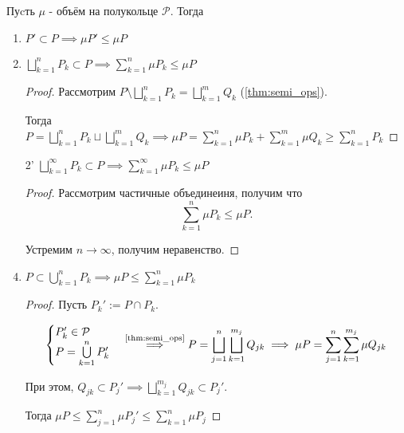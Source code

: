 \begin{properties} \thmslashn

    Пуcть $\mu$ - объём на полукольце $\mathcal{P}$. Тогда

    \begin{enumerate}
        \item $P' \subset P \implies \mu P' \le \mu P$
        \item $\bigsqcup\limits_{k=1}^{n} P_{k} \subset P \implies \sum\limits_{k=1}^{n} \mu P_{k} \le \mu P$
            \begin{proof} \thmslashn
            
                Рассмотрим $P \setminus \bigsqcup\limits_{k=1}^{n} P_{k}= \bigsqcup\limits_{k=1}^{m} Q_{k} $ (\autoref{thm:semi_ops}).

                Тогда $P = \bigsqcup\limits_{k=1}^{n} P_{k}\sqcup \bigsqcup\limits_{k=1}^{m} Q_{k} \implies \mu P = \sum\limits_{k=1}^{n} \mu P_{k} + \sum\limits_{k=1}^{m} \mu Q_{k} \ge \sum\limits_{k=1}^{n} P_{k}  $
            \end{proof}
        \item[2'] $\bigsqcup\limits_{k=1}^{\infty} P_{k} \subset P \implies \sum\limits_{k=1}^{\infty} \mu P_{k} \le \mu P$
            \begin{proof} \thmslashn
            
                Рассмотрим частичные объединеиня, получим что 
                \[ \sum\limits_{k=1}^{n} \mu P_{k} \le \mu P .\] 

                Устремим $n \to \infty$, получим неравенство.
            \end{proof}
        \item $P \subset \bigcup\limits_{k=1}^{n} P_{k} \implies \mu P \le \sum\limits_{k=1}^{n} \mu P_{k}$
            \begin{proof} \thmslashn
            
                Пусть $P_{k}' := P\cap P_{k}$. 
                
                \begin{equation*}
                    \begin{cases}
                        P_{k}'\in \mathcal{P}\\
                        P = \bigcup\limits_{k=1}^{n} P_{k}'
                    \end{cases} \overset{\text{\autoref{thm:semi_ops}}}{\implies} 
                    P = \bigsqcup\limits_{j=1}^{n}\bigsqcup\limits_{k=1}^{m_{j}} Q_{jk}
                    \implies \mu P = \sum\limits_{j=1}^{n}\sum\limits_{k=1}^{m_{j}} \mu Q_{jk}
                \end{equation*}


                При этом, $Q_{jk} \subset P_{j}' \implies \bigsqcup\limits_{k=1}^{m_{j}} Q_{jk} \subset P_{j}'$.

                Тогда $\mu P \le \sum\limits_{j=1}^{n} \mu P_{j}' \le \sum\limits_{k=1}^{n} \mu P_{j}$
            \end{proof}
    \end{enumerate}
\end{properties}
